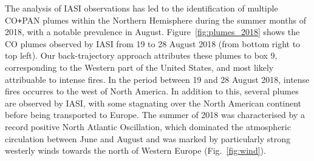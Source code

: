 \documentclass[acp, manuscript]{copernicus}
\begin{document}
The analysis of IASI observations has led to the identification of multiple CO\texttt{+}PAN plumes within the Northern Hemisphere during the summer months of 2018, with a notable prevalence in August. %
Figure~\ref{fig:plumes_2018} shows the CO plumes observed by IASI from 19 to 28 August 2018 (from bottom right to top left). Our back-trajectory approach attributes these plumes to box 9, corresponding to the Western part of the United States, and most likely attribuable to intense fires. In the period between 19 and 28 August 2018, intense fires occurres to the west of North America. In addition to this, several plumes are observed by IASI, with some stagnating over the North American continent before being transported to Europe. The summer of 2018 was characterised by a record positive North Atlantic Oscillation, which dominated the atmospheric circulation between June and August \citep{drouardDisentanglingDynamicContributions2019} and was marked by particularly strong westerly winds towards the north of Western Europe (Fig.~\ref{fig:wind}). 
\end{document}
